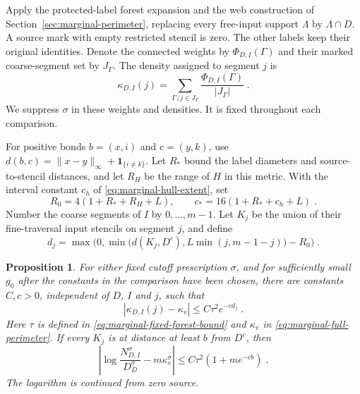 \documentclass[11pt]{article}
\newtheorem{proposition}{Proposition}
\begin{document}
Apply the protected-label forest expansion and the web construction of Section~\ref{sec:marginal-perimeter}, replacing every free-input support $\Lambda$ by $\Lambda\cap D$. A source mark with empty restricted stencil is zero. The other labels keep their original identities. Denote the connected weights by $\Phi_{D,I}(\Gamma)$ and their marked coarse-segment set by $J_\Gamma$. The density assigned to segment $j$ is
\begin{equation}\label{eq:regional-density}
    \kappa_{D,I}(j)=
        \sum_{\Gamma\, | \,j\in J_\Gamma}
            \frac{\Phi_{D,I}(\Gamma)}{|J_\Gamma|}\;.
\end{equation}
We suppress $\sigma$ in these weights and densities. It is fixed throughout each comparison.

For positive bonds $b=(x,i)$ and $c=(y,k)$, use $d(b,c)=\|x-y\|_\infty+\mathbf1_{\{i\ne k\}}$. Let $R_*$ bound the label diameters and source-to-stencil distances, and let $R_H$ be the range of $H$ in this metric. With the interval constant $c_h$ of \eqref{eq:marginal-hull-extent}, set
\begin{equation}
    R_0=4(1+R_*+R_H+L),
    \qquad c_*=16(1+R_*+c_h+L)\;.
\end{equation}
Number the coarse segments of $I$ by $0,\ldots,m-1$. Let $K_j$ be the union of their fine-traversal input stencils on segment $j$, and define
\begin{equation}\label{eq:regional-distance}
    d_j=\max\bigl(0,
        \min\bigl(d(K_j,D^c),L\min(j,m-1-j)\bigr)-R_0\bigr)\;.
\end{equation}

\begin{proposition}\label{prop:regional-coefficient}
For either fixed cutoff prescription $\sigma$, and for sufficiently small $g_0$ after the constants in the comparison have been chosen, there are constants $C,c>0$, independent of $D$, $I$ and $j$, such that
\begin{equation}\label{eq:regional-coefficient-bound}
    |\kappa_{D,I}(j)-\kappa_v|
        \leq C\tau^2e^{-cd_j}\;.
\end{equation}
Here $\tau$ is defined in \eqref{eq:marginal-fixed-forest-bound} and $\kappa_v$ in \eqref{eq:marginal-full-perimeter}. If every $K_j$ is at distance at least $b$ from $D^c$, then
\begin{equation}\label{eq:regional-summed-bound}
    \left|\log\frac{N_{D,I}^\sigma}{D_D^\sigma}-m\kappa_v^\sigma\right|
        \leq C\tau^2(1+me^{-cb})\;.
\end{equation}
The logarithm is continued from zero source.
\end{proposition}
\end{document}
